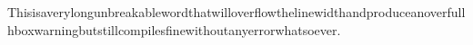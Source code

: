 \documentclass{article}
\begin{document}
Thisisaverylongunbreakablewordthatwilloverflowthelinewidthandproduceanoverfullhboxwarningbutstillcompilesfinewithoutanyerrorwhatsoever.
\end{document}
